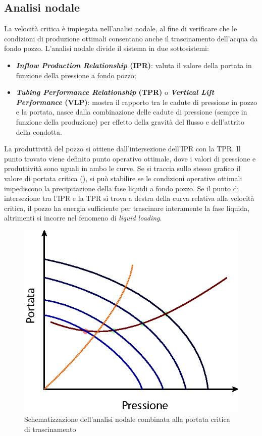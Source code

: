\subsection{Analisi nodale}
La velocità critica è impiegata nell'analisi nodale, al fine di verificare che le condizioni di produzione ottimali consentano anche il trascinamento dell'acqua da fondo pozzo. L'analisi nodale divide il sistema in due sottosistemi:
\begin{itemize}
    \item \textbf{\textit{Inflow Production Relationship} (IPR)}: valuta il valore della portata in funzione della pressione a fondo pozzo;
    \item \textbf{\textit{Tubing Performance Relationship} (TPR)} o \textbf{\textit{Vertical Lift Performance} (VLP)}: mostra il rapporto tra le cadute di pressione in pozzo e la portata, nasce dalla combinazione delle cadute di pressione (sempre in funzione della produzione) per effetto della gravità del flusso e dell'attrito della condotta.
\end{itemize}
La produttività del pozzo si ottiene dall'intersezione dell'IPR con la TPR. Il punto trovato viene definito punto operativo ottimale, dove i valori di pressione e produttività sono uguali in ambo le curve. Se si traccia sullo stesso grafico il valore di portata critica (), si può stabilire se le condizioni operative ottimali impediscono la precipitazione della fase liquidi a fondo pozzo. Se il punto di intersezione tra l'IPR e la TPR si trova a destra della curva relativa alla velocità critica, il pozzo ha energia sufficiente per trascinare interamente la fase liquida, altrimenti si incorre nel fenomeno di \textit{liquid loading}.

\begin{figure}[htbp]
    \centering
    \includegraphics[width=.5\textwidth]{fig/foamer/ipr-tpr.eps}
    \caption{Schematizzazione dell'analisi nodale combinata alla portata critica di trascinamento}
    \label{fig:ipr-tpr}
\end{figure}



